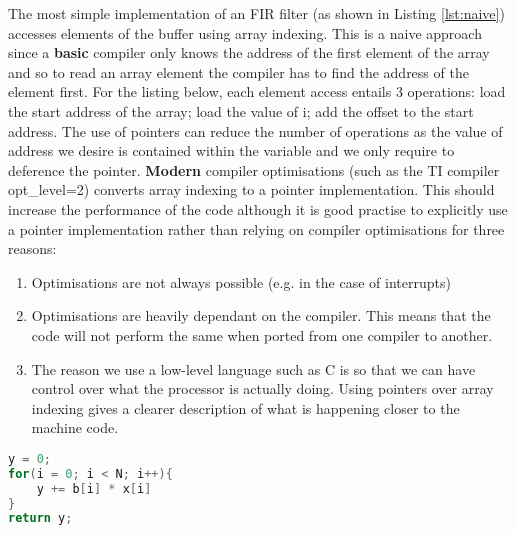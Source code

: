 The most simple implementation of an FIR filter (as shown in Listing \ref{lst:naive}) accesses elements of the buffer using array indexing. This is a naive approach since a {\bf basic} compiler only knows the address of the first element of the array and so to read an array element the compiler has to find the address of the element first. For the listing below, each element access entails 3 operations: load the start address of the array; load the value of i; add the offset to the start address. The use of pointers can reduce the number of operations as the value of address we desire is contained within the variable and we only require to deference the pointer. {\bf Modern} compiler optimisations (such as the TI compiler opt\_level=2) converts array indexing to a pointer implementation. This should increase the performance of the code although it is good practise to explicitly use a pointer implementation rather than relying on compiler optimisations for three reasons:
\begin{enumerate}
    \item Optimisations are not always possible (e.g. in the case of interrupts)
    \item Optimisations are heavily dependant on the compiler. This means that the code will not perform the same when ported from one compiler to another.
    \item The reason we use a low-level language such as C is so that we can have control over what the processor is actually doing. Using pointers over array indexing gives a clearer description of what is happening closer to the machine code.
\end{enumerate}

\begin{lstlisting}[language=C, frame=single, caption=Convolution, label = lst:naive]
y = 0;
for(i = 0; i < N; i++){
    y += b[i] * x[i]
}
return y;
\end{lstlisting}
